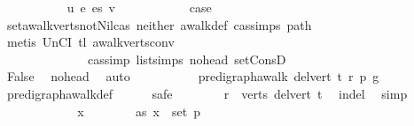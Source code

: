 \begin{isabellebody}
\ \ \ \ \ \ \ \ \isamarkupfalse%
\ {\isacharparenleft}{\kern0pt}{}\ u\ e\ es\ v{\isacharparenright}{\kern0pt}\isanewline
\ \ \ \ \ \ \ \ \isamarkupfalse%
\ \isamarkupfalse%
\ {\isacharquery}{\kern0pt}case\isanewline
\ \ \ \ \ \ \ \ \ \ \isamarkupfalse%
\ set{\isacharunderscore}{\kern0pt}awalk{\isacharunderscore}{\kern0pt}verts{\isacharunderscore}{\kern0pt}not{\isacharunderscore}{\kern0pt}Nil{\isacharunderscore}{\kern0pt}cas\ neither\ awalk{\isacharunderscore}{\kern0pt}def\ cas{\isachardot}{\kern0pt}simps{\isacharparenleft}{\kern0pt}{}{\isacharparenright}{\kern0pt}\ path\isanewline
\ \ \ \ \ \ \ \ \ \ \isamarkupfalse%
\ {\isacharparenleft}{\kern0pt}metis\ UnCI\ tl{}\ awalk{\isacharunderscore}{\kern0pt}verts{\isacharunderscore}{\kern0pt}conv{\isacharprime}{\kern0pt}\isanewline
\ \ \ \ \ \ \ \ \ \ \ \ \ \ cas{\isacharunderscore}{\kern0pt}simp\ list{\isachardot}{\kern0pt}simps{\isacharparenleft}{\kern0pt}{}{\isacharparenright}{\kern0pt}\ no{\isacharunderscore}{\kern0pt}head\ set{\isacharunderscore}{\kern0pt}ConsD{\isacharparenright}{\kern0pt}\ \ \isanewline
\ \ \ \ \ \ \isamarkupfalse%
\ \ \isanewline
\ \ \ \ \ \ \isamarkupfalse%
\ \isamarkupfalse%
\ False\ \isamarkupfalse%
\ no{\isacharunderscore}{\kern0pt}head\ \isamarkupfalse%
\ auto\isanewline
\ \ \ \ \isamarkupfalse%
\isanewline
\ \ \ \ \isamarkupfalse%
\ {\isachardoublequoteopen}pre{\isacharunderscore}{\kern0pt}digraph{\isachardot}{\kern0pt}awalk\ {\isacharparenleft}{\kern0pt}del{\isacharunderscore}{\kern0pt}vert\ t{\isacharparenright}{\kern0pt}\ r\ p\ g{\isachardoublequoteclose}\ \isanewline
\ \ \ \ \ \ \isamarkupfalse%
\ pre{\isacharunderscore}{\kern0pt}digraph{\isachardot}{\kern0pt}awalk{\isacharunderscore}{\kern0pt}def\isanewline
\ \ \ \ \isamarkupfalse%
\ safe\isanewline
\ \ \ \ \ \ \isamarkupfalse%
\ {\isachardoublequoteopen}r\ {\isasymin}\ verts\ {\isacharparenleft}{\kern0pt}del{\isacharunderscore}{\kern0pt}vert\ t{\isacharparenright}{\kern0pt}{\isachardoublequoteclose}\ \isamarkupfalse%
\ in{\isacharunderscore}{\kern0pt}del\ \isamarkupfalse%
\ simp\ \ \ \isanewline
\ \ \ \ \isamarkupfalse%
\isanewline
\ \ \ \ \ \ \isamarkupfalse%
\ x\isanewline
\ \ \ \ \ \ \isamarkupfalse%
\ as{}{\isacharcolon}{\kern0pt}\ {\isachardoublequoteopen}x\ {\isasymin}\ set\ p{\isachardoublequoteclose}\isanewline

\end{isabellebody}
